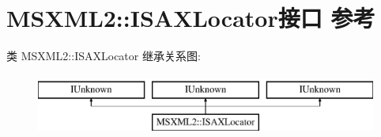 \hypertarget{interface_m_s_x_m_l2_1_1_i_s_a_x_locator}{}\section{M\+S\+X\+M\+L2\+:\+:I\+S\+A\+X\+Locator接口 参考}
\label{interface_m_s_x_m_l2_1_1_i_s_a_x_locator}
类 M\+S\+X\+M\+L2\+:\+:I\+S\+A\+X\+Locator 继承关系图\+:\begin{figure}[H]
\begin{center}
\leavevmode
\includegraphics[height=2.000000cm]{interface_m_s_x_m_l2_1_1_i_s_a_x_locator}
\end{center}
\end{figure}
